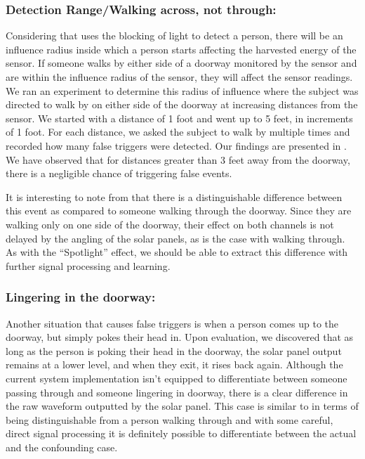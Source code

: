 \subsubsection{Detection Range/Walking across, not through:}
\label{subsubsec:range}
Considering that \sysname uses the blocking of light to detect a person, there will be an influence radius inside which a person starts affecting the harvested energy of the sensor.
If someone walks by either side of a doorway monitored by the \sysname sensor and are within the influence radius of the sensor, they will affect the sensor readings.
We ran an experiment to determine this radius of influence where the subject was directed to walk by on either side of the doorway at increasing distances from the sensor.
We started with a distance of 1 foot and went up to 5 feet, in increments of 1 foot.
For each distance, we asked the subject to walk by multiple times and recorded how many false triggers were detected.
Our findings are presented in .
We have observed that for distances greater than 3 feet away from the doorway, there is a negligible chance of triggering false events.

It is interesting to note from  that there is a distinguishable difference between this event as compared to someone walking through the doorway.
Since they are walking only on one side of the doorway, their effect on both channels is not delayed by the angling of the solar panels, as is the case with walking through.
As with the ``Spotlight'' effect, we should be able to extract this difference with further signal processing and learning.

\subsubsection{Lingering in the doorway:}
Another situation that causes false triggers is when a person comes up to the doorway, but simply pokes their head in.
Upon evaluation, we discovered that as long as the person is poking their head in the doorway, the solar panel output remains at a lower level, and when they exit, it rises back again.
Although the current system implementation isn't equipped to differentiate between someone passing through and someone lingering in doorway, there is a clear difference in the raw waveform outputted by the solar panel.
This case is similar to  in terms of being distinguishable from a person walking through and with some careful, direct signal processing it is definitely possible to differentiate between the actual and the confounding case.

